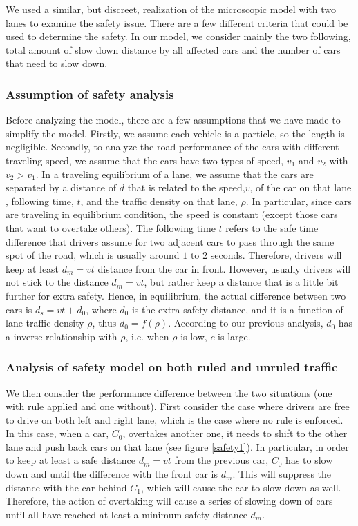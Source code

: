 We used a similar, but discreet, realization of the microscopic model with two lanes to examine the safety issue. There are a few different criteria that could be used to determine the safety. In our model, we consider mainly the two following, total amount of slow down distance by all affected cars and the number of cars that need to slow down. 

\subsubsection{Assumption of safety analysis}

Before analyzing the model, there are a few assumptions that we have made to simplify the model. Firstly, we assume each vehicle is a particle, so the length is negligible. Secondly, to analyze the road performance of the cars with different traveling speed, we assume that the cars have two types of speed, $v_1$ and $v_2$ with $v_2 > v_1$. In a traveling equilibrium of a lane, we assume that the cars are separated by a distance of $d$ that is related to the speed,$v$, of the car on that lane , following time, $t$, and the traffic density on that lane, $\rho$. In particular, since cars are traveling in equilibrium condition, the speed is constant (except those cars that want to overtake others). The following time $t$ refers to the safe time difference that drivers assume for two adjacent cars to pass through the same spot of the road, which is usually around $1$ to $2$ seconds. Therefore, drivers will keep at least $d_m = vt$ distance from the car in front. However, usually drivers will not stick to the distance $d_m = vt$, but rather keep a distance that is a little bit further for extra safety. Hence, in equilibrium, the actual difference between two cars is $d_s = vt + d_0$, where $d_0$ is the extra safety distance, and it is a function of lane traffic density $\rho$, thus $d_0 = f(\rho)$. According to our previous analysis, $d_0$ has a inverse relationship with $\rho$, i.e. when $\rho$ is low, $c$ is large.

\subsubsection{Analysis of safety model on both ruled and unruled traffic}

We then consider the performance difference between the two situations (one with rule applied and one without). First consider the case where drivers are free to drive on both left and right lane, which is the case where no rule is enforced. In this case, when a car, $C_0$, overtakes another one, it needs to shift to the other lane and push back cars on that lane (see figure \ref{safety1}). In particular, in order to keep at least a safe distance $d_m = vt$ from the previous car, $C_0$ has to slow down and until the difference with the front car is $d_m$. This will suppress the distance with the car behind $C_1$, which will cause the car to slow down as well. Therefore, the action of overtaking will cause a series of slowing down of cars until all have reached at least a minimum safety distance $d_m$. 

